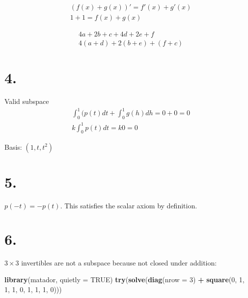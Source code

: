 \documentclass[]{article}
\newenvironment{Shaded}{\begin{snugshade}}{\end{snugshade}}
\newcommand{\DataTypeTok}[1]{\textcolor[rgb]{0.13,0.29,0.53}{#1}}
\newcommand{\DecValTok}[1]{\textcolor[rgb]{0.00,0.00,0.81}{#1}}
\newcommand{\KeywordTok}[1]{\textcolor[rgb]{0.13,0.29,0.53}{\textbf{#1}}}
\newcommand{\NormalTok}[1]{#1}
\newcommand{\OperatorTok}[1]{\textcolor[rgb]{0.81,0.36,0.00}{\textbf{#1}}}
\newcommand{\OtherTok}[1]{\textcolor[rgb]{0.56,0.35,0.01}{#1}}
\newcommand{\StringTok}[1]{\textcolor[rgb]{0.31,0.60,0.02}{#1}}
\begin{document}
\[\begin{aligned}& (f(x)+g(x))'=f'(x)+g'(x)\\
& 1 + 1 = f(x) + g(x)\end{aligned}\]

\[\begin{aligned} & 4a + 2b +c + 4d + 2e +f\\
&4(a+d)+2(b + e) +(f+ c)\end{aligned}\]

\hypertarget{section-3}{%
\section{4.}\label{section-3}}

Valid subspace \[
  \begin{aligned}
    & \int_0^1(p(t)dt + \int_0^1g(h)dh=0 + 0 = 0\\
    & k\int_0^1p(t)dt =k0 =0
  \end{aligned}
\]

Basis: \((1, t, t^2)\)

\hypertarget{section-4}{%
\section{5.}\label{section-4}}

\(p(-t)=-p(t)\). This satisfies the scalar axiom by definition.

\hypertarget{section-5}{%
\section{6.}\label{section-5}}

\(3\times{3}\) invertibles are not a subspace because not closed under
addition:

\begin{Shaded}
\begin{Highlighting}[]
\KeywordTok{library}\NormalTok{(matador, }\DataTypeTok{quietly =} \OtherTok{TRUE}\NormalTok{)}
\KeywordTok{try}\NormalTok{(}\KeywordTok{solve}\NormalTok{(}\KeywordTok{diag}\NormalTok{(}\DataTypeTok{nrow =} \DecValTok{3}\NormalTok{) }\OperatorTok{+}\StringTok{ }\KeywordTok{square}\NormalTok{(}\DecValTok{0}\NormalTok{, }\DecValTok{1}\NormalTok{, }\DecValTok{1}\NormalTok{, }\DecValTok{1}\NormalTok{, }\DecValTok{0}\NormalTok{, }\DecValTok{1}\NormalTok{,}
    \DecValTok{1}\NormalTok{, }\DecValTok{1}\NormalTok{, }\DecValTok{0}\NormalTok{)))}
\end{Highlighting}
\end{Shaded}
\end{document}
